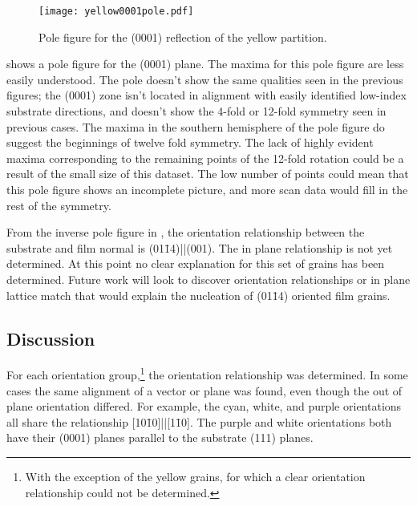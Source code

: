 \begin{figure}
\begin{center}
\texttt{[image: yellow0001pole.pdf]}
\caption[(0001) pole figure for yellow grains]{%
	Pole figure for the (0001) reflection of the yellow partition.}
\label{fig:yellow0001pole}
\end{center}
\end{figure}
 shows a pole figure for the (0001) plane. The maxima for this pole figure are less easily understood.  The pole doesn't show the same qualities seen in the previous figures; the (0001) zone isn't located in alignment with easily identified low-index substrate directions, and doesn't show the 4-fold or 12-fold symmetry seen in previous cases. The maxima in the southern hemisphere of the pole figure do suggest the beginnings of twelve fold symmetry. The lack of highly evident maxima corresponding to the remaining points of the 12-fold rotation could be a result of the small size of this dataset. The low number of points could mean that this pole figure shows an incomplete picture, and more scan data would fill in the rest of the symmetry.

From the inverse pole figure in , the orientation relationship between the substrate and film normal is (01\={1}4)||(001). The in plane relationship is not yet determined. At this point no clear explanation for this set of grains has been determined. Future work will look to discover orientation relationships or in plane lattice match that would explain the nucleation of (01\={1}4) oriented film grains.


\subsection{Discussion}
\label{subsec:single.growth.discussion}

For each orientation group,\footnote{With the exception of the yellow grains, for which a clear orientation relationship could not be determined.} the orientation relationship was determined. In some cases the same alignment of a vector or plane was found, even though the out of plane orientation differed. For example, the cyan, white, and purple orientations all share the relationship [10\={1}0]||[1\={1}0]. The purple and white orientations both have their (0001) planes parallel to the substrate (111) planes.

